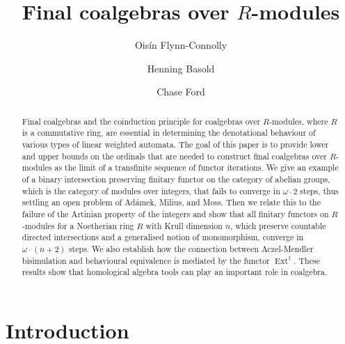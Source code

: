 \documentclass[runningheads]{llncs}
\begin{document}
\title{Final coalgebras over $R$-modules}







\author{
Ois\'{i}n Flynn-Connolly
 \and 
Henning Basold 
 \and
Chase Ford}
\maketitle             
\begin{abstract}
  Final coalgebras and the coinduction principle for coalgebras over $R$-modules, where $R$ is a commutative ring, are essential in determining the denotational behaviour of various types of linear weighted automata.
  The goal of this paper is to provide lower and upper bounds on the ordinals that are needed to construct final coalgebras over $R$-modules as the limit of a transfinite sequence of functor iterations.
  We give an example of a binary intersection preserving finitary functor on the category of abelian groups, which is the category of modules over integers, that fails to converge in $\omega \cdot 2$ steps, thus settling an open problem of Ad\'{a}mek, Milius, and Moss.
  Then we relate this to the failure of the Artinian property of the integers and show that all finitary functors on $R$-modules for a Noetherian ring $R$ with Krull dimension $n$, which preserve countable directed intersections and a generalised notion of monomorphism, converge in $\omega \cdot (n + 2)$ steps.
  We also establish how the connection between Aczel-Mendler bisimulation and behavioural equivalence is mediated by the functor $\operatorname{Ext}^1$.
  These results show that homological algebra tools can play an important role in coalgebra.
\end{abstract}
\section{Introduction}
\label{sec:intro}
\end{document}

